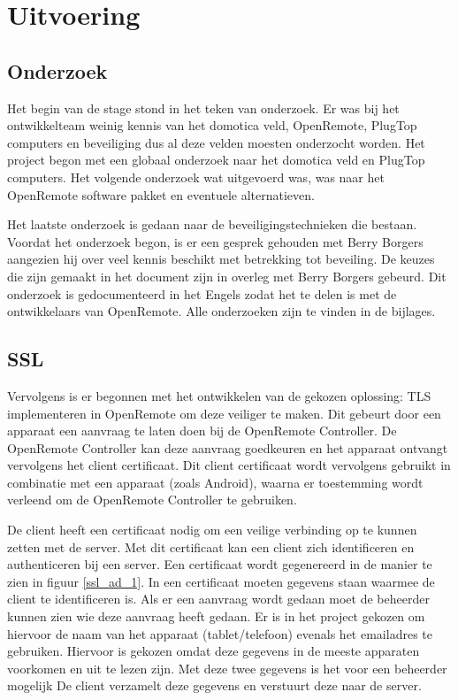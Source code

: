 \documentclass[]{article}
\begin{document}
\section{Uitvoering}

\subsection{Onderzoek}

Het begin van de stage stond in het teken van onderzoek. Er was bij het
ontwikkelteam weinig kennis van het domotica veld, OpenRemote, PlugTop computers
en beveiliging dus al deze velden moesten onderzocht worden. Het project begon
met een globaal onderzoek naar het domotica veld en PlugTop computers. Het
volgende onderzoek wat uitgevoerd was, was naar het OpenRemote software pakket en
eventuele alternatieven.

Het laatste onderzoek is gedaan naar de beveiligingstechnieken die bestaan.
Voordat het onderzoek begon, is er een gesprek gehouden met Berry Borgers
aangezien hij over veel kennis beschikt met betrekking tot beveiling. De keuzes
die zijn gemaakt in het document zijn in overleg met Berry Borgers gebeurd. Dit
onderzoek is gedocumenteerd in het Engels zodat het te delen is met de
ontwikkelaars van OpenRemote. Alle onderzoeken zijn  te vinden in de bijlages.

\subsection{SSL}
Vervolgens is er begonnen met het ontwikkelen van de gekozen oplossing:
TLS implementeren in OpenRemote om deze veiliger te maken. Dit gebeurt
door een apparaat een aanvraag te laten doen bij de OpenRemote Controller. De
OpenRemote Controller kan deze aanvraag goedkeuren en het apparaat ontvangt
vervolgens het client certificaat. Dit client certificaat wordt vervolgens
gebruikt in combinatie met een apparaat (zoals Android), waarna er toestemming
wordt verleend om de OpenRemote Controller te gebruiken.

De client heeft een certificaat nodig om een veilige verbinding op te kunnen
zetten met de server. Met dit certificaat kan een client zich identificeren en
authenticeren bij een server. Een certificaat wordt gegenereerd in de manier te
zien in figuur \ref{ssl_ad_1}. In een certificaat moeten gegevens staan waarmee
de client te identificeren is. Als er een aanvraag wordt gedaan moet de
beheerder kunnen zien wie deze aanvraag heeft gedaan. Er is in het project
gekozen om hiervoor de naam van het apparaat (tablet/telefoon) evenals het
emailadres te gebruiken. Hiervoor is gekozen omdat deze gegevens in de meeste
apparaten voorkomen en uit te lezen zijn. Met deze twee gegevens is het voor een
beheerder mogelijk  De client verzamelt deze gegevens en verstuurt deze naar de
server. 
\end{document}
